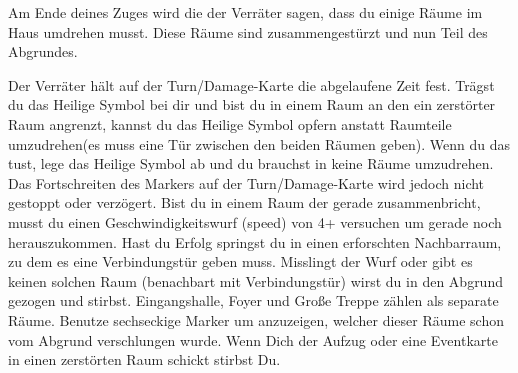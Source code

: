 Am Ende deines Zuges wird die der Verräter sagen, dass du einige Räume im Haus umdrehen musst. Diese Räume sind zusammengestürzt und nun Teil des Abgrundes.


    \begin{itemize}
        \bitem  Der Verräter hält auf der Turn/Damage-Karte die abgelaufene Zeit fest.
        \bitem Trägst du das Heilige Symbol bei dir und bist du in einem Raum an den ein zerstörter Raum angrenzt, kannst du das Heilige Symbol opfern anstatt Raumteile umzudrehen(es muss eine Tür zwischen den beiden Räumen geben). Wenn du das tust, lege das Heilige Symbol ab und du brauchst in keine Räume umzudrehen. Das Fortschreiten des Markers auf der Turn/Damage-Karte wird jedoch nicht gestoppt oder verzögert.
        \bitem Bist du in einem Raum der gerade zusammenbricht, musst du einen Geschwindigkeitswurf (speed) von 4+ versuchen um gerade noch herauszukommen. Hast du Erfolg springst du in einen erforschten Nachbarraum, zu dem es eine Verbindungstür geben muss. Misslingt der Wurf oder gibt es keinen solchen Raum (benachbart mit Verbindungstür) wirst du in den Abgrund gezogen und stirbst.
        \bitem Eingangshalle, Foyer und Große Treppe zählen als separate Räume. Benutze sechseckige Marker um anzuzeigen, welcher dieser Räume schon vom Abgrund verschlungen wurde.
        \bitem Wenn Dich der Aufzug oder eine Eventkarte in einen zerstörten Raum schickt stirbst Du.
    \end{itemize}


